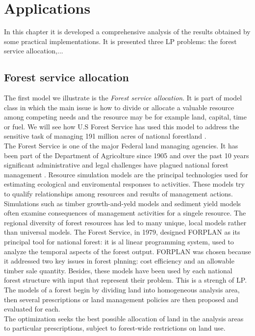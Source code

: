 \documentclass[a4paper,10 pt,titlepage,twoside]{book}
\theoremstyle{plain}
\theoremstyle{definition}
\theoremstyle{remark}
\begin{document}
\chapter{Applications}
In this chapter it is developed a comprehensive analysis of the results obtained by some practical implementations. It is presented three LP problems: the forest service allocation,...\\
\section{Forest service allocation} 
The first model we illustrate is the \textit{Forest service allocation}. It is part of model class in which the main issue is how to divide or allocate a valuable resource among competing needs and the resource may be for example land, capital, time or fuel. We will see how U.S Forest Service has used this model to address the sensitive task of managing 191 million acres of national forestland \cite{(Natural)}.\\
The Forest Service is one of the major Federal land managing agencies. It has been part of the Department of Agricolture since 1905 and over the past 10 years significant administrative and legal challenges have plagued national forest management \cite{ForSer}. Resource simulation models are the principal technologies used for estimating ecological and enviromental responses to activities. These models try to qualify relationships among resources and results of management actions. Simulations such as timber growth-and-yeld models and sediment yield models often examine consequences of management activities for a singele resource. The regional diversity of forest resources has led to many unique, local models rather than universal models. The Forest Service, in 1979, designed FORPLAN as its principal tool for national forest: it is al linear programming system, used to analyze the temporal aspects of the forest output. FORPLAN was chosen because it addressed two key issues in forest plnning: cost efficiency and an allowable timber sale quantity. Besides, these models have been used by each national forest structure with input that represent their problem. This is a strengh of LP. \\
The models of a forest begin  by dividing land into homogeneous analysis area, then several prescriptions or land management policies are then proposed and evaluated for each. \\The optimization seeks the best possible allocation of land in the analysis areas to particular prescriptions, subject to forest-wide restrictions on land use.
\end{document}
